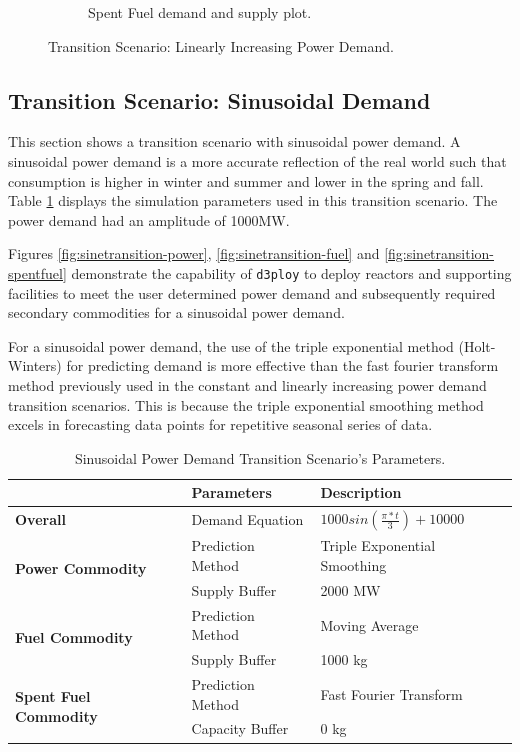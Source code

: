 \documentclass[11pt,letterpaper]{article}
\newcommand{\deploy}{\texttt{d3ploy}\xspace}%
\begin{document}
\begin{figure}[!htbp]
\begin{subfigure}[t]{0.45\textwidth}
        \caption{Spent Fuel demand and supply plot.}
        \label{fig:growingtransition-spentfuel}
    \end{subfigure}
    \caption{Transition Scenario: Linearly Increasing Power Demand.}
\end{figure}

\subsection{\textbf{Transition Scenario: Sinusoidal Demand}}
This section shows a transition scenario with sinusoidal
power demand. 
A sinusoidal power demand is a more accurate reflection of
the real world such that consumption is higher in winter and summer
and lower in the spring and fall. 
Table \ref{tab:transition-scenario-sine-power} displays the 
simulation parameters used in this transition scenario. The power demand
had an amplitude of 1000MW.

Figures \ref{fig:sinetransition-power}, \ref{fig:sinetransition-fuel}
and \ref{fig:sinetransition-spentfuel} demonstrate the capability 
of \deploy to deploy reactors and supporting facilities to meet the user 
determined power demand and subsequently required secondary commodities 
for a sinusoidal power demand. 

For a sinusoidal power demand, the use of the triple exponential method
(Holt-Winters)
for predicting demand is more effective than the 
fast fourier transform method previously used in the constant 
and linearly increasing power demand transition scenarios. 
This is because the triple exponential smoothing method excels in
forecasting data points for repetitive seasonal series of data.  

\begin{table}[!htbp]
	\centering
	\caption {Sinusoidal Power Demand Transition Scenario's Parameters.}
	\label{tab:transition-scenario-sine-power}
	\begin{tabular}{|l|l|p{4.5cm}|}
		\hline
		& \textbf{Parameters}    & \textbf{Description} \\ \hline
		\textbf{Overall}& Demand Equation & $1000sin(\frac{\pi*t}{3})+10000$ \\ \hline
		\multirow{2}{*}{\textbf{Power Commodity}} & Prediction Method      &  Triple Exponential Smoothing \\ \cline{2-3} 
		& Supply Buffer          &  2000 MW \\ \hline
		\multirow{2}{*}{\textbf{Fuel Commodity}}  & Prediction Method      &  Moving Average\\ \cline{2-3}
		& Supply Buffer & 1000 kg \\ \hline
		\multirow{2}{*}{\textbf{Spent Fuel Commodity}}  & Prediction Method      & Fast Fourier Transform\\ \cline{2-3}
		& Capacity Buffer & 0 kg \\ \hline
	\end{tabular}
\end{table}
\end{document}
